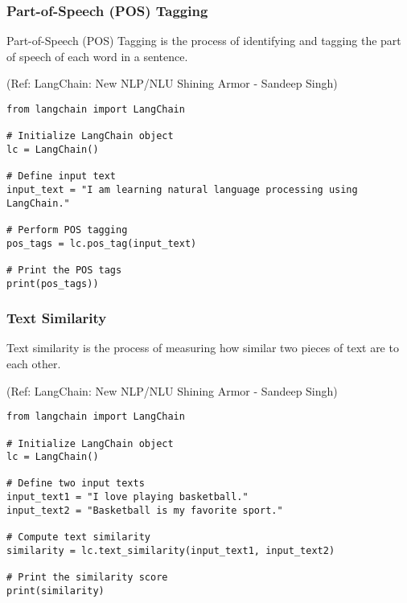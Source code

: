 \begin{frame}[fragile]\frametitle{Part-of-Speech (POS) Tagging}

Part-of-Speech (POS) Tagging is the process of identifying and tagging the part of speech of each word in a sentence. 

{\tiny (Ref: LangChain: New NLP/NLU Shining Armor - Sandeep Singh)}

\begin{lstlisting}
from langchain import LangChain

# Initialize LangChain object
lc = LangChain()

# Define input text
input_text = "I am learning natural language processing using LangChain."

# Perform POS tagging
pos_tags = lc.pos_tag(input_text)

# Print the POS tags
print(pos_tags))
\end{lstlisting}	  

\end{frame}

\begin{frame}[fragile]\frametitle{Text Similarity}

Text similarity is the process of measuring how similar two pieces of text are to each other.

{\tiny (Ref: LangChain: New NLP/NLU Shining Armor - Sandeep Singh)}

\begin{lstlisting}
from langchain import LangChain

# Initialize LangChain object
lc = LangChain()

# Define two input texts
input_text1 = "I love playing basketball."
input_text2 = "Basketball is my favorite sport."

# Compute text similarity
similarity = lc.text_similarity(input_text1, input_text2)

# Print the similarity score
print(similarity)
\end{lstlisting}	  

\end{frame}

